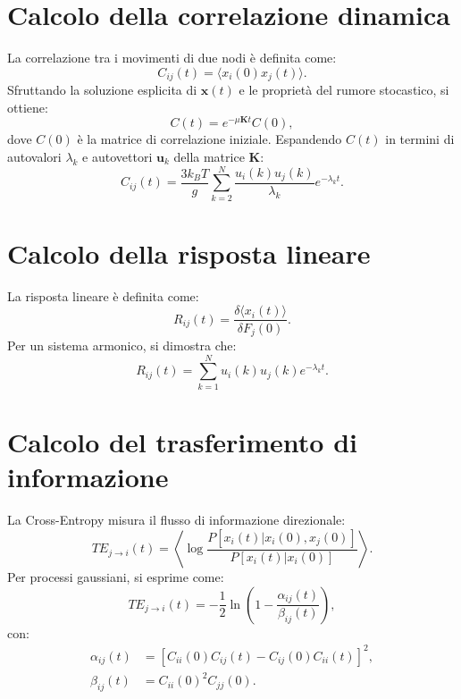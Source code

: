 \documentclass[Lau,binding=0.6cm,oneside,noexaminfo]{sapthesis}
\begin{document}
\section{Calcolo della correlazione dinamica}
La correlazione tra i movimenti di due nodi è definita come:
\begin{equation}
C_{ij}(t) = \langle x_i(0) x_j(t) \rangle.
\end{equation}
Sfruttando la soluzione esplicita di $\mathbf{x}(t)$ e le proprietà del rumore stocastico, si ottiene:
\begin{equation}
C(t) = e^{-\mu \mathbf{K} t} C(0),
\end{equation}
dove $C(0)$ è la matrice di correlazione iniziale. Espandendo $C(t)$ in termini di autovalori $\lambda_k$ e autovettori $\mathbf{u}_k$ della matrice $\mathbf{K}$:
\begin{equation}
C_{ij}(t) = \frac{3 k_B T}{g} \sum_{k=2}^N \frac{u_i(k) u_j(k)}{\lambda_k} e^{-\lambda_k t}.
\end{equation}

\section{Calcolo della risposta lineare}
La risposta lineare è definita come:
\begin{equation}
R_{ij}(t) = \frac{\delta \langle x_i(t) \rangle}{\delta F_j(0)}.
\end{equation}
Per un sistema armonico, si dimostra che:
\begin{equation}
R_{ij}(t) = \sum_{k=1}^N u_i(k) u_j(k) e^{-\lambda_k t}.
\end{equation}

\section{Calcolo del trasferimento di informazione}
La Cross-Entropy misura il flusso di informazione direzionale:
\begin{equation}
TE_{j \to i}(t) = \left\langle \log \frac{P[x_i(t) | x_i(0), x_j(0)]}{P[x_i(t) | x_i(0)]} \right\rangle.
\end{equation}
Per processi gaussiani, si esprime come:
\begin{equation}
TE_{j \to i}(t) = -\frac{1}{2} \ln \left( 1 - \frac{\alpha_{ij}(t)}{\beta_{ij}(t)} \right),
\end{equation}
con:
\begin{align}
\alpha_{ij}(t) &= [C_{ii}(0) C_{ij}(t) - C_{ij}(0) C_{ii}(t)]^2, \\
\beta_{ij}(t) &= C_{ii}(0)^2 C_{jj}(0).
\end{align}
\end{document}

